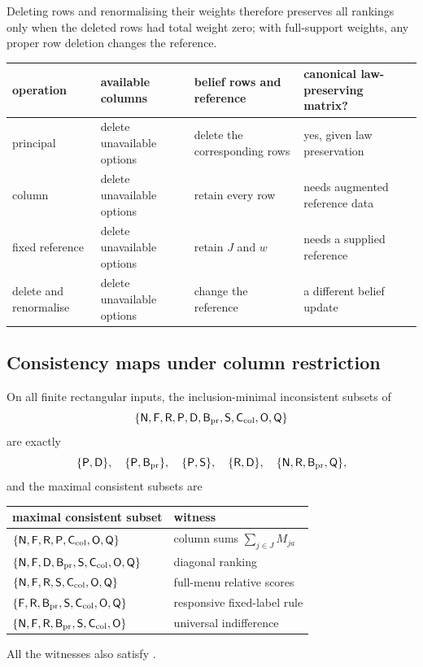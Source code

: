Deleting rows and renormalising their weights therefore preserves all rankings only when the deleted
rows had total weight zero; with full-support weights, any proper row deletion changes the
reference.

\begin{center}
\small
\renewcommand{\arraystretch}{1.25}
\begin{tabularx}{\textwidth}{@{}>{\raggedright\arraybackslash}p{7.2em}
                                  >{\raggedright\arraybackslash}X
                                  >{\raggedright\arraybackslash}X
                                  >{\raggedright\arraybackslash}p{8.4em}@{}}
  \toprule
  operation & available columns & belief rows and reference & canonical law-preserving matrix? \\
  \midrule
  principal & delete unavailable options & delete the corresponding rows & yes, given law preservation \\
  column & delete unavailable options & retain every row & needs augmented reference data \\
  fixed reference & delete unavailable options & retain $J$ and $w$ & needs a supplied reference \\
  delete and renormalise & delete unavailable options & change the reference & a different belief update \\
  \bottomrule
\end{tabularx}
\end{center}

\subsection{Consistency maps under column restriction}

\begin{theorem}\label{thm:colmap}
On all finite rectangular inputs, the inclusion-minimal inconsistent subsets of
\[
  \{\textup{\textsf{N}},\textup{\textsf{F}},\textup{\textsf{R}},\textup{\textsf{P}},\textup{\textsf{D}},\textup{\textsf{B}}_{\mathrm{pr}},\textup{\textsf{S}},\textup{\textsf{C}}_{\mathrm{col}},\textup{\textsf{O}},\textup{\textsf{Q}}\}
\]
are exactly
\[
  \{\textup{\textsf{P}},\textup{\textsf{D}}\},\quad\{\textup{\textsf{P}},\textup{\textsf{B}}_{\mathrm{pr}}\},\quad\{\textup{\textsf{P}},\textup{\textsf{S}}\},\quad\{\textup{\textsf{R}},\textup{\textsf{D}}\},\quad
  \{\textup{\textsf{N}},\textup{\textsf{R}},\textup{\textsf{B}}_{\mathrm{pr}},\textup{\textsf{Q}}\},
\]
and the maximal consistent subsets are
\begin{center}
\small
\begin{tabular}{@{}ll@{}}
  \toprule
  maximal consistent subset & witness \\
  \midrule
  $\{\textup{\textsf{N}},\textup{\textsf{F}},\textup{\textsf{R}},\textup{\textsf{P}},\textup{\textsf{C}}_{\mathrm{col}},\textup{\textsf{O}},\textup{\textsf{Q}}\}$ & column sums $\sum_{j\in J}M_{ja}$ \\
  $\{\textup{\textsf{N}},\textup{\textsf{F}},\textup{\textsf{D}},\textup{\textsf{B}}_{\mathrm{pr}},\textup{\textsf{S}},\textup{\textsf{C}}_{\mathrm{col}},\textup{\textsf{O}},\textup{\textsf{Q}}\}$ & diagonal ranking \\
  $\{\textup{\textsf{N}},\textup{\textsf{F}},\textup{\textsf{R}},\textup{\textsf{S}},\textup{\textsf{C}}_{\mathrm{col}},\textup{\textsf{O}},\textup{\textsf{Q}}\}$ & full-menu relative scores \\
  $\{\textup{\textsf{F}},\textup{\textsf{R}},\textup{\textsf{B}}_{\mathrm{pr}},\textup{\textsf{S}},\textup{\textsf{C}}_{\mathrm{col}},\textup{\textsf{O}},\textup{\textsf{Q}}\}$ & responsive fixed-label rule \\
  $\{\textup{\textsf{N}},\textup{\textsf{F}},\textup{\textsf{R}},\textup{\textsf{B}}_{\mathrm{pr}},\textup{\textsf{S}},\textup{\textsf{C}}_{\mathrm{col}},\textup{\textsf{O}}\}$ & universal indifference \\
  \bottomrule
\end{tabular}
\end{center}
All the witnesses also satisfy \Mon.
\end{theorem}

